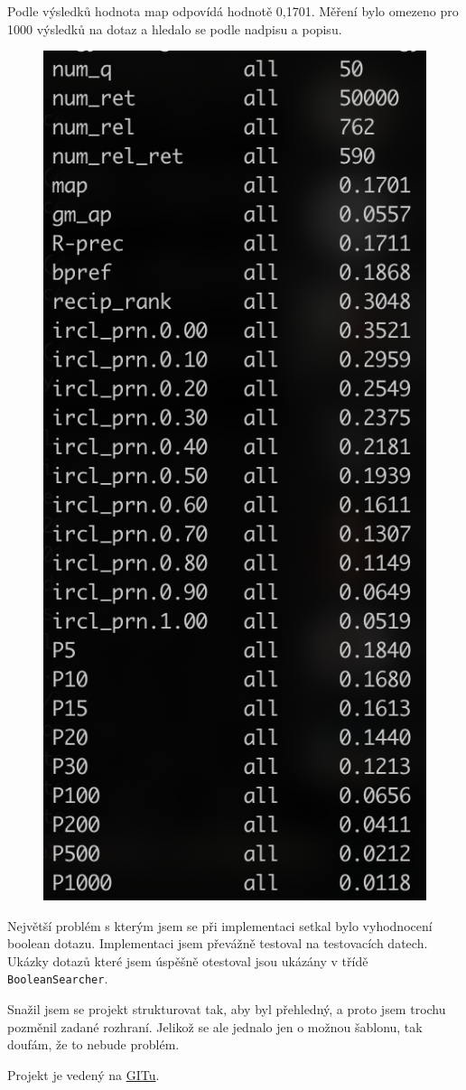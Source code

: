 \documentclass[12pt, a4paper]{article}
\begin{document}
\noindent Podle výsledků hodnota map odpovídá hodnotě 0,1701. Měření bylo omezeno pro 1000 výsledků na dotaz a hledalo se podle nadpisu a popisu.

\begin{figure}[H]
  \centering
  \includegraphics[scale=0.5]{img/result.png}
  \label{struktura}
\end{figure}

Největší problém s kterým jsem se při implementaci setkal bylo  vyhodnocení boolean dotazu. Implementaci jsem převážně testoval na testovacích datech. Ukázky dotazů které jsem úspěšně otestoval jsou ukázány v třídě \texttt{BooleanSearcher}.

Snažil jsem se projekt strukturovat tak, aby byl přehledný, a proto jsem trochu pozměnil zadané rozhraní. Jelikož se ale jednalo jen o možnou šablonu, tak doufám, že to nebude problém.

Projekt je vedený na \href{https://github.com/cagysek/IncredibleElastic}{GITu}.
\end{document}
